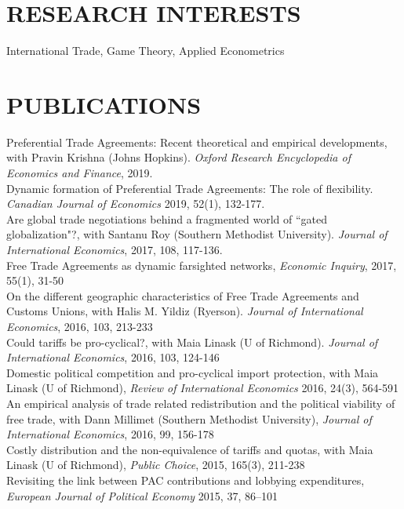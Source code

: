 \documentclass[11pt]{res}
\begin{document}
\begin{resume}
\section{RESEARCH INTERESTS}\vspace{1.5mm}
International Trade, Game Theory, Applied Econometrics

\section{PUBLICATIONS}\vspace{1.5mm}
{Preferential Trade Agreements: Recent theoretical and empirical developments}, with Pravin Krishna (Johns Hopkins). \emph{Oxford Research Encyclopedia of Economics and Finance}, 2019.\vspace{1.5mm}\\
{Dynamic formation of Preferential Trade Agreements: The role of flexibility}. \emph{Canadian Journal of Economics} 2019, 52(1), 132-177. \vspace{1.5mm}\\
{Are global trade negotiations behind a fragmented world of ``gated globalization"?}, with Santanu Roy (Southern Methodist University). \emph{Journal of International Economics}, 2017, 108, 117-136.\vspace{1.5mm}\\
{ Free Trade Agreements as dynamic farsighted networks}, \emph{Economic Inquiry}, 2017, 55(1), 31-50\vspace{1.5mm}\\


{On the different geographic characteristics of Free Trade Agreements and Customs Unions}, with Halis M. Yildiz (Ryerson). \emph{Journal of International Economics}, 2016, 103, 213-233 \vspace{1.5mm}\\
{Could tariffs be pro-cyclical?}, with Maia Linask (U of Richmond). \emph{Journal of International Economics}, 2016, 103, 124-146 \vspace{1.5mm}\\
{Domestic political competition and pro-cyclical import protection}, with Maia Linask (U of Richmond), \emph{Review of International Economics} 2016, 24(3), 564-591\vspace{1.5mm}\\
{An empirical analysis of trade related redistribution and the political viability of free trade}, with Dann Millimet (Southern Methodist University), \emph{Journal of International Economics}, 2016, 99, 156-178 \vspace{1.5mm}\\
{Costly distribution and the non-equivalence of tariffs and quotas}, with Maia Linask (U of Richmond), \emph{Public Choice}, 2015, 165(3), 211-238 \vspace{1.5mm}\\
{Revisiting the link between PAC contributions and lobbying expenditures, \emph{European Journal of Political Economy}} 2015, 37, 86--101


\end{resume}
\end{document}
